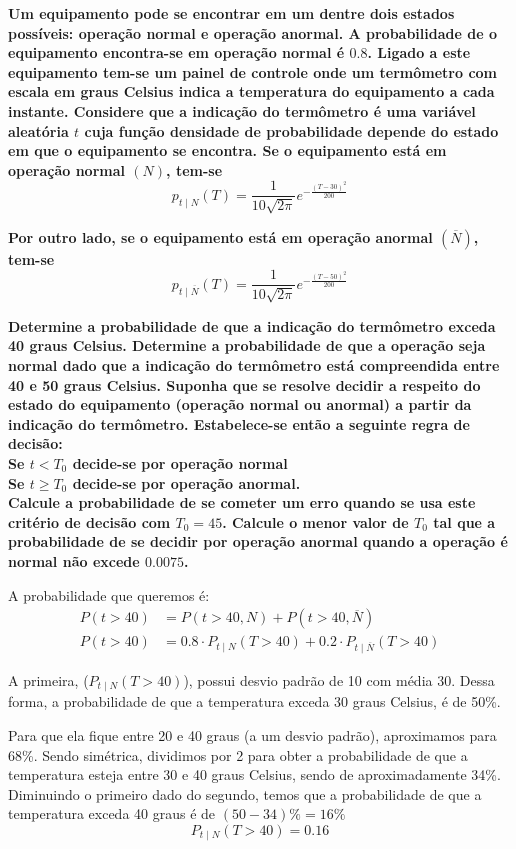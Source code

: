 \documentclass[a5paper]{report}
\begin{document}
\textbf{Um equipamento pode se encontrar em um dentre dois estados\\ possíveis: operação normal e operação anormal.
A probabilidade de o equipamento encontra-se em operação normal é $0.8$. Ligado a este equipamento tem-se um painel de controle onde um termômetro com escala em graus Celsius indica a temperatura do equipamento a cada instante. Considere que a indicação do termômetro é uma variável aleatória $t$ cuja função densidade de probabilidade depende do estado em que o equipamento se encontra. Se o equipamento está em operação normal $(N)$, tem-se}
\[p_{t \mid N}(T) = \frac{1}{10\sqrt{2\pi}} e^{-\frac{(T - 30)^2}{200}}\]

\textbf{Por outro lado, se o equipamento está em operação anormal $(\overline{N})$, tem-se}
\[p_{t \mid \overline{N}}(T) = \frac{1}{10\sqrt{2\pi}} e^{-\frac{(T - 50)^2}{200}}\]

\textbf{Determine a probabilidade de que a indicação do termômetro exceda 40 graus Celsius.
Determine a probabilidade de que a operação seja normal dado que a indicação do
termômetro está compreendida entre 40 e 50 graus Celsius. 
Suponha que se resolve decidir a respeito do estado do equipamento (operação normal ou anormal) a partir da
indicação do termômetro. Estabelece-se então a seguinte regra de decisão:\\
Se $t < T_0$ decide-se por operação normal\\
Se $t \geq T_0$ decide-se por operação anormal.\\
Calcule a probabilidade de se cometer um erro quando se usa este critério de decisão com
$T_0 = 45$. Calcule o menor valor de $T_0$ tal que a probabilidade de se decidir por operação
anormal quando a operação é normal não excede $0.0075$.}

A probabilidade que queremos é:
\begin{align*}
    P(t > 40) &= P(t > 40, N) + P(t > 40, \overline{N})\\
    P(t > 40) &= 0.8 \cdot P_{t \mid N}(T > 40) + 0.2 \cdot P_{t \mid \overline{N}}(T > 40)
\end{align*}

A primeira, ($P_{t \mid N}(T > 40)$), possui desvio padrão de 10 com média 30. Dessa forma, a probabilidade de que a temperatura exceda 30 graus Celsius, é de 50\%.

Para que ela fique entre 20 e 40 graus (a um desvio padrão), aproximamos para 68\%. Sendo simétrica, dividimos por 2 para obter a probabilidade de que a temperatura esteja entre 30 e 40 graus Celsius, sendo de aproximadamente 34\%. Diminuindo o primeiro dado do segundo, temos que a probabilidade de que a temperatura exceda 40 graus é de $(50 - 34)\% = 16\%$
\[P_{t \mid N}(T > 40) = 0.16\]
\end{document}

